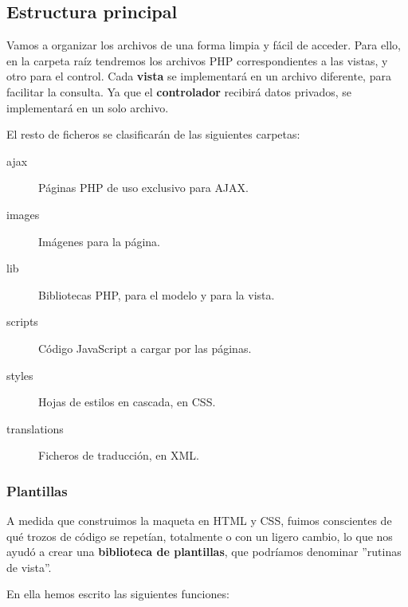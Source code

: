 \subsection{Estructura principal}

Vamos a organizar los archivos de una forma limpia y fácil de acceder. Para ello, en la carpeta raíz tendremos los archivos \acrshort{PHP} correspondientes a las vistas, y otro para el control. Cada \textbf{vista} se implementará en un archivo diferente, para facilitar la consulta. Ya que el \textbf{controlador} recibirá datos privados, se implementará en un solo archivo.

El resto de ficheros se clasificarán de las siguientes carpetas:

\begin{description}
	\item[ajax] Páginas \acrshort{PHP} de uso exclusivo para \acrshort{AJAX}.
	\item[images] Imágenes para la página.
	\item[lib] Bibliotecas \acrshort{PHP}, para el modelo y para la vista.
	\item[scripts] Código JavaScript a cargar por las páginas.
	\item[styles] Hojas de estilos en cascada, en \acrshort{CSS}.
	\item[translations] Ficheros de traducción, en \acrshort{XML}.
\end{description}

\subsubsection{Plantillas}

A medida que construimos la maqueta en \acrshort{HTML} y \acrshort{CSS}, fuimos conscientes de qué trozos de código se repetían, totalmente o con un ligero cambio, lo que nos ayudó a crear una \textbf{biblioteca de plantillas}, que podríamos denominar ''rutinas de vista''.

En ella hemos escrito las siguientes funciones:

